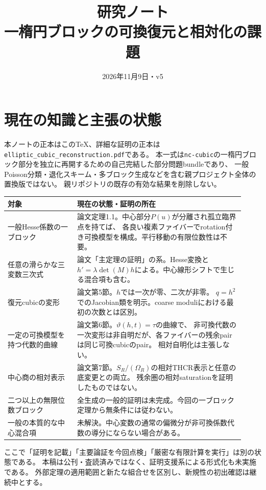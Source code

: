 
\title{研究ノート\\\large 一楕円ブロックの可換復元と相対化の課題}
\author{}
\date{2026年11月9日・v5}

\maketitle

\section{現在の知識と主張の状態}
本ノートの正本はこのTeX、詳細な証明の正本は
\texttt{elliptic\_cubic\_reconstruction.pdf}である。
本一式は\texttt{nc-cubic}の一楕円ブロック部分を独立に再開するための自己完結した部分問題bundleであり、
一般Poisson分類・退化スキーム・多ブロック生成などを含む親プロジェクト全体の置換版ではない。
親リポジトリの既存の有効な結果を削除しない。

\begin{longtable}{p{0.27\linewidth}p{0.65\linewidth}}
\toprule
対象 & 現在の状態・証明の所在\\\midrule
一般Hesse係数の一ブロック & 論文定理1.1。中心部分$P(u)$が分離され孤立臨界点を持てば、
各良い複素ファイバーでrotation付き可換模型を構成。平行移動の有限位数性は不要。\\
任意の滑らかな三変数三次式 & 論文「主定理の証明」の系。Hesse変換と
$h'=\lambda\det(M)h$による。中心線形シフトで生じる混合項も含む。\\
復元cubicの変形 & 論文第5節。$h$では一次が零、二次が非零。
$q=h^2$でのJacobian類を明示。coarse moduliにおける最初の次数とは区別。\\
一定の可換模型を持つ代数的曲線 & 論文第6節。$\vartheta(h,t)=\tau$の曲線で、
非可換代数の一次変形は非自明だが、各ファイバーの残余pairは同じ可換cubicのpair。
相対自明化は主張しない。\\
中心商の相対表示 & 論文第7節。$S_R/(\Omega_R)$の相対THCR表示と任意の底変更との両立。
残余圏の相対saturationを証明したものではない。\\
二つ以上の無限位数ブロック & 全生成の一般的証明は未完成。今回の一ブロック定理から無条件には従わない。\\
一般の本質的な中心混合項 & 未解決。中心変数の通常の偏微分が非可換係数代数の導分にならない場合がある。\\
\bottomrule
\end{longtable}

ここで「証明を記載」「主要論証を今回点検」「厳密な有限計算を実行」は別の状態である。
本稿は公刊・査読済みではなく、証明支援系による形式化も未実施である。
外部定理の適用範囲と新たな組合せを区別し、新規性の初出確認は継続中とする。

